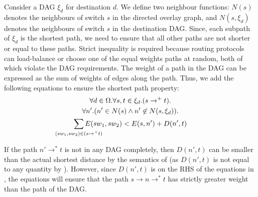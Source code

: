 Consider a DAG $\xi_d$ for destination $d$. We define two neighbour
functions: $N(s)$ denotes the neighbours of switch $s$ 
in the directed overlay graph, and $N(s, \xi_d)$ denotes
the neighbours of switch $s$ in the destination DAG. 
Since, each subpath of $\xi_d$ is the shortest path,
we need to ensure that all other
paths are not shorter or equal to these paths.  
Strict inequality is required because routing protocols
can load-balance or choose one of the equal weights paths at
random, both of which violate the DAG requirements. The weight
of a path in the DAG can be expressed as the sum of weights of 
edges along the path. 
Thus, we add the following equations to ensure the
shortest path property:
\begin{multline} \label{eq:uniq}
		\forall d \in \Omega. \forall s, t \in \xi_d. (s \rightarrow^+ t).\\ 
		\forall n'. (n' \in N(s) \wedge n' \not\in N(s, \xi_d)). \\
		\sum_{\mathclap{\substack{(sw_1, sw_2) \in (s \rightarrow^+ t)}}} 
		E(sw_1, sw_2) < E(s, n') + D(n', t)
\end{multline}

If the path $n' \rightarrow^* t$ 
is not in any DAG completely, then
$D(n',t)$ can be smaller than the actual shortest distance by the
semantics of  (as
$D(n',t)$ is not equal to any quantity by ).
However, since $D(n',t)$ is on the RHS of the equations in ,
the equations will ensure that the path $s\rightarrow n \rightarrow^* t$
has strictly greater weight than the path of the DAG.

